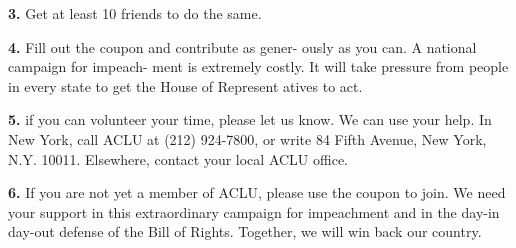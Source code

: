 \documentclass{article}
\begin{document}
\begin{multicols}{3}
{\bf 3.} Get at least 10 friends to do the same.

{\bf 4.} Fill out the coupon and contribute as gener-\lb
ously as you can. A national campaign for impeach-\lb
ment is extremely costly. It will take pressure from\lb
people in every state to get the House of Represent\lb
atives to act.

{\bf 5.} 
if you can volunteer your time, please let us\lb
know. We can use your help. In New York, call\lb
ACLU at (212) 924-7800, or write 84 Fifth Avenue,\lb
New York, N.Y. 10011. Elsewhere, contact your local\lb
ACLU office.

{\bf 6.} 
If you are not yet a member of ACLU, please\lb
use the coupon to join. We need your support in\lb
this extraordinary campaign for impeachment and\lb
in the day-in day-out defense of the Bill of Rights.\lb
\indent Together, we will win back our country.
\vfill
\end{multicols}
\end{document}
